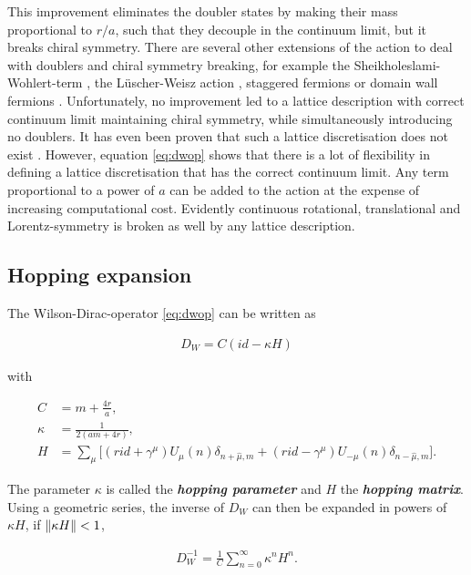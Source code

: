 \documentclass{article}
\theoremstyle{plain} %
\theoremstyle{convention} %
\theoremstyle{remark} %
\def\df#1{\textbf{\textit{#1}}}
\numberwithin{equation}{section}
\begin{document}
This improvement eliminates the doubler states by making their mass proportional to $r/a$, such that they decouple in the continuum limit, but it breaks chiral symmetry. There are several other extensions of the action to deal with doublers and chiral symmetry breaking, for example the Sheikholeslami-Wohlert-term \cite{sheikholeslami1985}, the Lüscher-Weisz action \cite{luscher1985}, staggered fermions \cite{kogut1975} or domain wall fermions \cite{shamir1993}. Unfortunately, no improvement led to a lattice description with correct continuum limit maintaining chiral symmetry, while simultaneously introducing no doublers. It has even been proven that such a lattice discretisation does not exist \cite{nielsen1981}. However, equation \eqref{eq:dwop} shows that there is a lot of flexibility in defining a lattice discretisation that has the correct continuum limit. Any term proportional to a power of $a$ can be added to the action at the expense of increasing computational cost. Evidently continuous rotational, translational and Lorentz-symmetry is broken as well by any lattice description.

\subsection{Hopping expansion}

\label{sec:hopping_expansion}

The Wilson-Dirac-operator \eqref{eq:dwop} can be written as

\begin{align*}
    D_W = C ( id - \kappa H )
\end{align*}

with 

\begin{align*}
    C &= m + \frac{4r}{a}, \\
    \kappa &= \frac{1}{2(a m + 4r)}, \\
    H &= \sum_{\mu} \Big[ (r id + \gamma^{\mu}) U_{\mu}(n) \delta_{n + \hat{\mu},m} + (r id - \gamma^{\mu}) U_{-\mu}(n) \delta_{n - \hat{\mu},m} \Big].
\end{align*}

The parameter $\kappa$ is called the \df{hopping parameter} and $H$ the \df{hopping matrix}. Using a geometric series, the inverse of $D_W$ can then be expanded in powers of $\kappa H$, if $\norm{\kappa H} < 1$,

\begin{align*}
    D_W^{-1} = \frac{1}{C} \sum_{n=0}^{\infty} \kappa^n H^n.
\end{align*}
\end{document}

